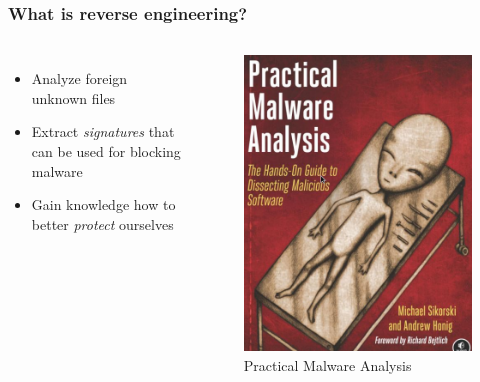 \documentclass[10pt,xcolor=pdflatex]{beamer}
\begin{document}
\begin{frame}\frametitle{What is reverse engineering?}

  \begin{columns}
    \begin{itemize}
        \item Analyze foreign unknown files
        \item Extract \emph{signatures} that can be used for blocking malware
        \item Gain knowledge how to better \emph{protect} ourselves
    \end{itemize}
    \begin{figure}
      \centering
      \includegraphics[width=.8\textwidth]{../images/pma.png}
      \caption{Practical Malware Analysis}
    \end{figure}
  \end{columns}

\end{frame}
\end{document}
